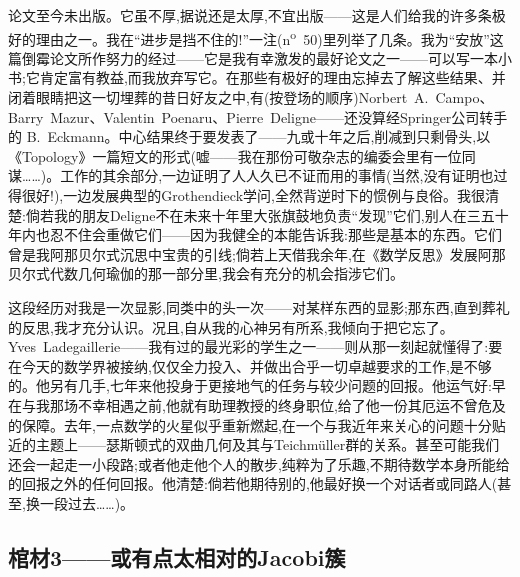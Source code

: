 论文至今未出版。它虽不厚,据说还是太厚,不宜出版——这是人们给我的许多条极好的理由之一。我在“进步是挡不住的!”一注(n\textsuperscript{o}~50)里列举了几条。我为“安放”这篇倒霉论文所作努力的经过——它是我有幸激发的最好论文之一——可以写一本小书;它肯定富有教益,而我放弃写它。在那些有极好的理由忘掉去了解这些结果、并闭着眼睛把这一切埋葬的昔日好友之中,有(按登场的顺序)Norbert~A.~Campo、Barry~Mazur、Valentin~Poenaru、Pierre~Deligne——还没算经Springer公司转手的 B.~Eckmann\dmark{}。中心结果终于要发表了——九或十年之后,削减到只剩骨头,以《Topology》一篇短文的形式(嘘——我在那份可敬杂志的编委会里有一位同谋……)。工作的其余部分,一边证明了人人久已不证而用的事情(当然,没有证明也过得很好!),一边发展典型的Grothendieck学问,全然背逆时下的惯例与良俗。我很清楚:倘若我的朋友Deligne不在未来十年里大张旗鼓地负责“发现”它们,别人在三五十年内也忍不住会重做它们——因为我健全的本能告诉我:那些是基本的东西。它们曾是我阿那贝尔式沉思中宝贵的引线;倘若上天借我余年,在《数学反思》发展阿那贝尔式代数几何瑜伽的那一部分里,我会有充分的机会指涉它们。

这段经历对我是一次显影,同类中的头一次——对某样东西的显影;那东西,直到葬礼的反思,我才充分认识。况且,自从我的心神另有所系,我倾向于把它忘了。Yves~Ladegaillerie——我有过的最光彩的学生之一——则从那一刻起就懂得了:要在今天的数学界被接纳,仅仅全力投入、并做出合乎一切卓越要求的工作,是不够的。他另有几手,七年来他投身于更接地气的任务与较少问题的回报。他运气好:早在与我那场不幸相遇之前,他就有助理教授的终身职位\dmark{},给了他一份其厄运不曾危及的保障。去年,一点数学的火星似乎重新燃起,在一个与我近年来关心的问题十分贴近的主题上——瑟斯顿式的双曲几何及其与Teichmüller群的关系。甚至可能我们还会一起走一小段路;或者他走他个人的散步,纯粹为了乐趣,不期待数学本身所能给的回报之外的任何回报。他清楚:倘若他期待别的,他最好换一个对话者或同路人(甚至,换一段过去……)。

\subsection{棺材3——或有点太相对的Jacobi簇}

